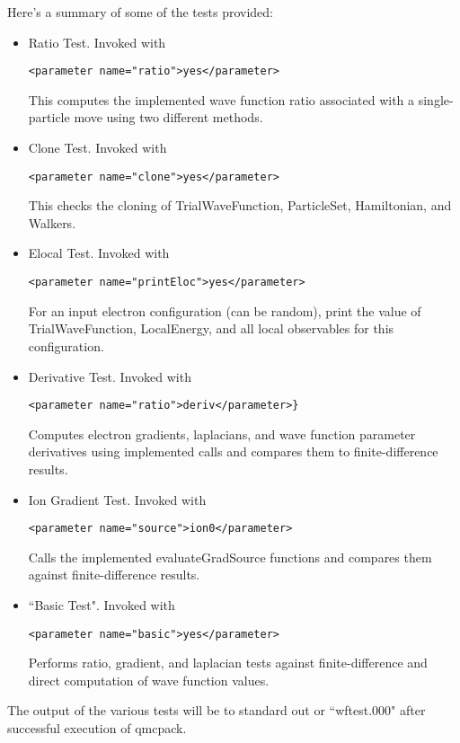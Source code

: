 Here's a summary of some of the tests provided:
\begin{itemize}
\item Ratio Test.  Invoked with \begin{verbatim}<parameter name="ratio">yes</parameter>\end{verbatim}  This computes the implemented wave function ratio associated with a single-particle move using two different methods.
\item Clone Test. Invoked with \begin{verbatim}<parameter name="clone">yes</parameter>\end{verbatim}  This checks the cloning of TrialWaveFunction, ParticleSet, Hamiltonian, and Walkers.  
\item Elocal Test.  Invoked with \begin{verbatim}<parameter name="printEloc">yes</parameter>\end{verbatim}  For an input electron configuration (can be random), print the value of TrialWaveFunction, LocalEnergy, and all local observables for this configuration.  
\item Derivative Test.  Invoked with \begin{verbatim}<parameter name="ratio">deriv</parameter>}\end{verbatim}  Computes electron gradients, laplacians, and wave function parameter derivatives using implemented calls and compares them to finite-difference results.   
\item Ion Gradient Test.  Invoked with \begin{verbatim}<parameter name="source">ion0</parameter>\end{verbatim}  Calls the implemented evaluateGradSource functions and compares them against finite-difference results.  
\item ``Basic Test".  Invoked with \begin{verbatim}<parameter name="basic">yes</parameter>\end{verbatim}  Performs ratio, gradient, and laplacian tests against finite-difference and direct computation of wave function values.  

\end{itemize}

The output of the various tests will be to standard out or ``wftest.000" after successful execution of qmcpack.  
 
